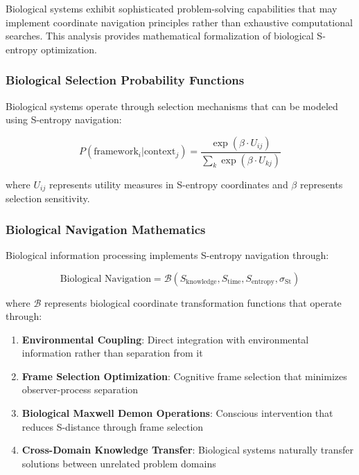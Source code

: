 \documentclass[11pt]{article}
\theoremstyle{definition}
\theoremstyle{remark}
\newcommand{\StellasConstant}{\sigma_{\text{St}}}
\begin{document}
Biological systems exhibit sophisticated problem-solving capabilities that may implement coordinate navigation principles rather than exhaustive computational searches. This analysis provides mathematical formalization of biological S-entropy optimization.

\subsubsection{Biological Selection Probability Functions}

Biological systems operate through selection mechanisms that can be modeled using S-entropy navigation:

\begin{equation}
P(\text{framework}_i | \text{context}_j) = \frac{\exp(\beta \cdot U_{ij})}{\sum_k \exp(\beta \cdot U_{kj})}
\end{equation}

where $U_{ij}$ represents utility measures in S-entropy coordinates and $\beta$ represents selection sensitivity.

\subsubsection{Biological Navigation Mathematics}

Biological information processing implements S-entropy navigation through:

\begin{equation}
\text{Biological Navigation} = \mathcal{B}(S_{\text{knowledge}}, S_{\text{time}}, S_{\text{entropy}}, \StellasConstant)
\end{equation}

where $\mathcal{B}$ represents biological coordinate transformation functions that operate through:

\begin{enumerate}
\item \textbf{Environmental Coupling}: Direct integration with environmental information rather than separation from it
\item \textbf{Frame Selection Optimization}: Cognitive frame selection that minimizes observer-process separation
\item \textbf{Biological Maxwell Demon Operations}: Conscious intervention that reduces S-distance through frame selection
\item \textbf{Cross-Domain Knowledge Transfer}: Biological systems naturally transfer solutions between unrelated problem domains
\end{enumerate}
\end{document}

